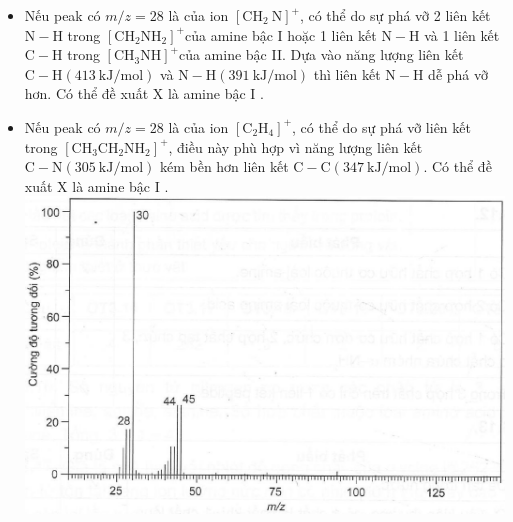 \documentclass[10pt]{article}
\begin{document}
\begin{itemize}
  \item Nếu peak có $m / z=28$ là của ion $\left[\mathrm{CH}_{2} \mathrm{~N}\right]^{+}$, có thể do sự phá vỡ 2 liên kết $\mathrm{N}-\mathrm{H}$ trong $\left[\mathrm{CH}_{2} \mathrm{NH}_{2}\right]^{+}$của amine bậc I hoặc 1 liên kết $\mathrm{N}-\mathrm{H}$ và 1 liên kết $\mathrm{C}-\mathrm{H}$ trong $\left[\mathrm{CH}_{3} \mathrm{NH}\right]^{+}$của amine bậc II. Dựa vào năng lượng liên kết $\mathrm{C}-\mathrm{H}(413 \mathrm{~kJ} / \mathrm{mol})$ và $\mathrm{N}-\mathrm{H}(391 \mathrm{~kJ} / \mathrm{mol})$ thì liên kết $\mathrm{N}-\mathrm{H}$ dễ phá vỡ hơn. Có thể đề xuất X là amine bậc I .
  \item Nếu peak có $m / z=28$ là của ion $\left[\mathrm{C}_{2} \mathrm{H}_{4}\right]^{+}$, có thể do sự phá vỡ liên kết trong $\left[\mathrm{CH}_{3} \mathrm{CH}_{2} \mathrm{NH}_{2}\right]^{+}$, điều này phù hợp vì năng lượng liên kết $\mathrm{C}-\mathrm{N} (305 \mathrm{~kJ} / \mathrm{mol})$ kém bền hơn liên kết $\mathrm{C}-\mathrm{C}(347 \mathrm{~kJ} / \mathrm{mol})$. Có thể đề xuất X là amine bậc I .\\
\includegraphics[max width=\textwidth, center]{2025_10_23_b4e16b74380d0f7e7700g-056}
\end{itemize}
\end{document}
